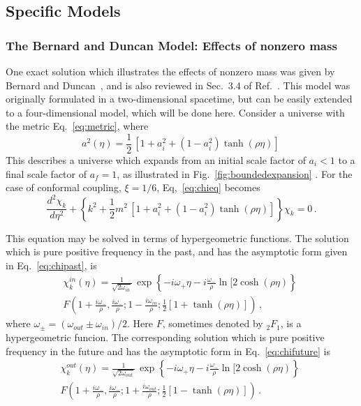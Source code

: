\documentclass[12pt,onecolumn,eqsecnum,floats,aps,prd,floatfix,titlepage,tightenlines]{revtex4-2}
\begin{document}
\subsection{Specific Models}
\label{sec:specific}

\subsubsection{The Bernard and Duncan Model: Effects of nonzero mass}
\label{sec:BD}
 One exact solution which illustrates the effects of nonzero mass was given by Bernard and 
 Duncan~\cite{BeDu}, and is also reviewed in Sec.~3.4 of  Ref.~\cite{BD}. This model was 
 originally formulated in a two-dimensional spacetime, but can be easily extended to a four-dimensional model, 
 which will be done here. Consider a universe with the metric  Eq.~\eqref{eq:metric}, where
  \begin{equation}
 a^2(\eta) = \frac{1}{2}\, [1 + a_i^2 +(1-a_i^2) \tanh(\rho \eta)]\,
 \label{eq:BD-scale}
 \end{equation}
This describes a universe which expands from an initial scale factor of $a_i < 1$ to a final
scale factor of $a_f =1$, as illustrated in Fig.~\ref{fig:boundedexpansion}  . For the case of conformal coupling, $\xi =1/6$,
Eq,~\eqref{eq:chieq} becomes
 \begin{equation}
 {\frac{d^2\chi_k}{d\eta^2}} + \left\{ k^2 +  \frac{1}{2} m^2\, \left[1 + a_i^2 +(1-a_i^2) \tanh(\rho \eta)\right]\right\}\chi_{k} =0 \, .
                                                 \label{eq:chieq-BD}
 \end{equation} 

This equation may be solved in terms of hypergeometric functions. The solution which is pure positive 
frequency in the past, and has the asymptotic form given in Eq.~\eqref{eq:chipast}, is
 \begin{multline}
 \chi^{in}_k(\eta) =    \frac{1}{\sqrt{2\omega_{in}}}\, \exp\left\{-i \omega_{+}   \eta - i \frac{\omega_{-}}{ \rho} \ln[2 \cosh(\rho \eta) \right\}\;\\
 F\left(1+\frac{i \omega_{-}}{\rho}, \frac{i \omega_{-}}{\rho}; 1-\frac{i \omega_{in}}{\rho}; 
\frac{1}{2} [1+ \tanh(\rho \eta)] \right)\,,
\label{eq:chi-in}
 \end{multline}
 where $\omega_\pm = (\omega_{out} \pm \omega_{in})/2$. Here $F$, sometimes denoted by ${}_2F_1$, is a hypergeometric funcion.
The corresponding solution which  is pure positive  frequency in the future and has the asymptotic form in Eq.~\eqref{eq:chifuture} is
 \begin{multline}
 \chi^{out}_k(\eta) =  \frac{1}{\sqrt{2\omega_{out}}}\, \exp\left\{-i \omega_{+}   \eta - i \frac{\omega_{-}}{ \rho} \ln[2 \cosh(\rho \eta) \right\}\;\\
 F\left(1+\frac{i \omega_{-}}{\rho}, \frac{i \omega_{-}}{\rho}; 1 + \frac{i \omega_{out}}{\rho}; 
\frac{1}{2} [1- \tanh(\rho \eta)] \right)\,.
\label{eq:chi-out}
 \end{multline}
 
\end{document}
